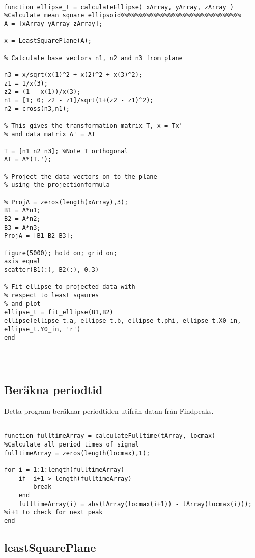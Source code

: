 \begin{lstlisting}[style=Matlab-editor]

function ellipse_t = calculateEllipse( xArray, yArray, zArray )
%Calculate mean square ellipsoid%%%%%%%%%%%%%%%%%%%%%%%%%%%%%%%%%
A = [xArray yArray zArray];

x = LeastSquarePlane(A);

% Calculate base vectors n1, n2 and n3 from plane

n3 = x/sqrt(x(1)^2 + x(2)^2 + x(3)^2);
z1 = 1/x(3); 
z2 = (1 - x(1))/x(3);
n1 = [1; 0; z2 - z1]/sqrt(1+(z2 - z1)^2);
n2 = cross(n3,n1);

% This gives the transformation matrix T, x = Tx'
% and data matrix A' = AT

T = [n1 n2 n3]; %Note T orthogonal
AT = A*(T.');

% Project the data vectors on to the plane
% using the projectionformula

% ProjA = zeros(length(xArray),3);
B1 = A*n1;
B2 = A*n2;
B3 = A*n3;
ProjA = [B1 B2 B3];

figure(5000); hold on; grid on;
axis equal
scatter(B1(:), B2(:), 0.3)

% Fit ellipse to projected data with
% respect to least sqaures
% and plot
ellipse_t = fit_ellipse(B1,B2)
ellipse(ellipse_t.a, ellipse_t.b, ellipse_t.phi, ellipse_t.X0_in, ellipse_t.Y0_in, 'r')
end




\end{lstlisting}

\subsection{Beräkna periodtid}

Detta program beräknar periodtiden utifrån datan från Findpeaks. 

\begin{lstlisting}[style=Matlab-editor]

function fulltimeArray = calculateFulltime(tArray, locmax)
%Calculate all period times of signal
fulltimeArray = zeros(length(locmax),1);

for i = 1:1:length(fulltimeArray)
    if  i+1 > length(fulltimeArray)
        break
    end
    fulltimeArray(i) = abs(tArray(locmax(i+1)) - tArray(locmax(i))); %i+1 to check for next peak
end

\end{lstlisting}

\subsection{leastSquarePlane}

